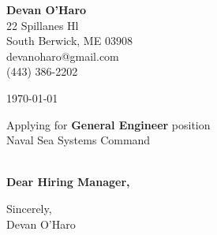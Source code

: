\documentclass[12pt]{article}
\makeatletter
\newcommand{\yourname}{Devan O'Haro}
\newcommand{\youraddress}{22 Spillanes Hl}
\newcommand{\yourcitystatezip}{South Berwick, ME 03908}
\newcommand{\youremail}{devanoharo@gmail.com}
\newcommand{\yourphone}{(443) 386-2202}
\newcommand{\dateofletter}{\today}
\newcommand{\recipient}{Hiring Manager}
\newcommand{\companyname}{Naval Sea Systems Command}
\newcommand{\companycitystatezip}{}
\newcommand{\job}{General Engineer}
\makeatother
\begin{document}
\noindent
\begin{minipage}[t]{0.6\textwidth}
    \textbf{\yourname} \\
    \youraddress \\
    \yourcitystatezip \\
    \youremail \\
    \yourphone
\end{minipage}%
\hfill
\begin{minipage}[t]{0.35\textwidth}
    \raggedleft
    \dateofletter
\end{minipage}
\vspace{2em}

\noindent
Applying for \textbf{\job} position\\
\companyname \\
\companycitystatezip \\
\vspace{2em}

\noindent
\textbf{Dear \recipient,} \\
\vspace{1em}

\noindent
\vspace{1em}

\noindent
Sincerely, \\
\vspace{2em}
\yourname
\end{document}

